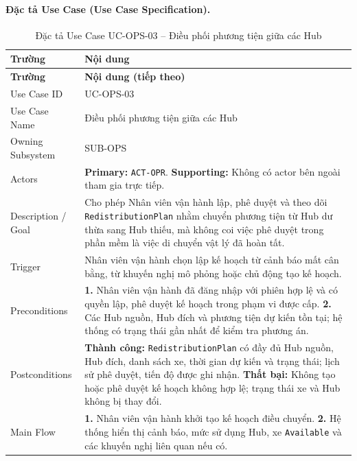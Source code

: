 \paragraph{Đặc tả Use Case (Use Case Specification).}
\small
\begin{longtable}{|L{42mm}|L{102mm}|}
  \caption{Đặc tả Use Case UC-OPS-03 -- Điều phối phương tiện giữa các Hub}\label{tab:spec-UC-OPS-03}\\
  \hline
  \centering\arraybackslash\textbf{Trường} & \centering\arraybackslash\textbf{Nội dung}\\
  \hline
  \endfirsthead
  \hline
  \centering\arraybackslash\textbf{Trường} & \centering\arraybackslash\textbf{Nội dung (tiếp theo)}\\
  \hline
  \endhead
  Use Case ID & UC-OPS-03\\\hline
  Use Case Name & Điều phối phương tiện giữa các Hub\\\hline
  Owning Subsystem & SUB-OPS\\\hline
  Actors & \textbf{Primary:} \texttt{ACT-OPR}. \textbf{Supporting:} Không có actor bên ngoài tham gia trực tiếp.\\\hline
  Description / Goal & Cho phép Nhân viên vận hành lập, phê duyệt và theo dõi \texttt{RedistributionPlan} nhằm chuyển phương tiện từ Hub dư thừa sang Hub thiếu, mà không coi việc phê duyệt trong phần mềm là việc di chuyển vật lý đã hoàn tất.\\\hline
  Trigger & Nhân viên vận hành chọn lập kế hoạch từ cảnh báo mất cân bằng, từ khuyến nghị mô phỏng hoặc chủ động tạo kế hoạch.\\\hline
  Preconditions &
    \textbf{1.} Nhân viên vận hành đã đăng nhập với phiên hợp lệ và có quyền lập, phê duyệt kế hoạch trong phạm vi được cấp.\newline
    \textbf{2.} Các Hub nguồn, Hub đích và phương tiện dự kiến tồn tại; hệ thống có trạng thái gần nhất để kiểm tra phương án.\\\hline
  Postconditions &
    \textbf{Thành công:} \texttt{RedistributionPlan} có đầy đủ Hub nguồn, Hub đích, danh sách xe, thời gian dự kiến và trạng thái; lịch sử phê duyệt, tiến độ được ghi nhận.\newline
    \textbf{Thất bại:} Không tạo hoặc phê duyệt kế hoạch không hợp lệ; trạng thái xe và Hub không bị thay đổi.\\\hline
  Main Flow &
    \textbf{1.} Nhân viên vận hành khởi tạo kế hoạch điều chuyển.\newline
    \textbf{2.} Hệ thống hiển thị cảnh báo, mức sử dụng Hub, xe \texttt{Available} và các khuyến nghị liên quan nếu có.\newline

\end{longtable}
